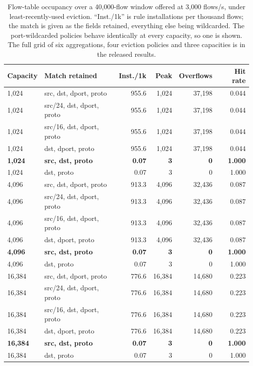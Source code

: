 \documentclass{ieeeaccess}
\begin{document}
\begin{table}[!t]
\caption{Flow-table occupancy over a 40,000-flow window offered at 3,000
flows/s, under least-recently-used eviction. ``Inst./1k'' is rule installations
per thousand flows; the match is given as the fields retained, everything else
being wildcarded. The port-wildcarded policies behave identically at every
capacity, so one is shown. The full grid of six aggregations, four eviction
policies and three capacities is in the released results.}
\centering
\label{tab:tcam}
\footnotesize
\setlength{\tabcolsep}{3.5pt}
\renewcommand{\arraystretch}{1.15}
\begin{tabular}{@{}llrrrr@{}}
\toprule
\textbf{Capacity} & \textbf{Match retained} & \textbf{Inst./1k} &
\textbf{Peak} & \textbf{Overflows} & \textbf{Hit rate} \\
\midrule
1,024  & src, dst, dport, proto      & 955.6 & 1,024 & 37,198 & 0.044 \\
1,024  & src/24, dst, dport, proto   & 955.6 & 1,024 & 37,198 & 0.044 \\
1,024  & src/16, dst, dport, proto   & 955.6 & 1,024 & 37,198 & 0.044 \\
1,024  & dst, dport, proto           & 955.6 & 1,024 & 37,198 & 0.044 \\
\textbf{1,024}  & \textbf{src, dst, proto} & \textbf{0.07} & \textbf{3} & \textbf{0} & \textbf{1.000} \\
1,024  & dst, proto                  & 0.07  & 3     & 0      & 1.000 \\
\midrule
4,096  & src, dst, dport, proto      & 913.3 & 4,096 & 32,436 & 0.087 \\
4,096  & src/24, dst, dport, proto   & 913.3 & 4,096 & 32,436 & 0.087 \\
4,096  & src/16, dst, dport, proto   & 913.3 & 4,096 & 32,436 & 0.087 \\
4,096  & dst, dport, proto           & 913.3 & 4,096 & 32,436 & 0.087 \\
\textbf{4,096}  & \textbf{src, dst, proto} & \textbf{0.07} & \textbf{3} & \textbf{0} & \textbf{1.000} \\
4,096  & dst, proto                  & 0.07  & 3     & 0      & 1.000 \\
\midrule
16,384 & src, dst, dport, proto      & 776.6 & 16,384 & 14,680 & 0.223 \\
16,384 & src/24, dst, dport, proto   & 776.6 & 16,384 & 14,680 & 0.223 \\
16,384 & src/16, dst, dport, proto   & 776.6 & 16,384 & 14,680 & 0.223 \\
16,384 & dst, dport, proto           & 776.6 & 16,384 & 14,680 & 0.223 \\
\textbf{16,384} & \textbf{src, dst, proto} & \textbf{0.07} & \textbf{3} & \textbf{0} & \textbf{1.000} \\
16,384 & dst, proto                  & 0.07  & 3      & 0      & 1.000 \\
\bottomrule
\end{tabular}
\end{table}
\end{document}
